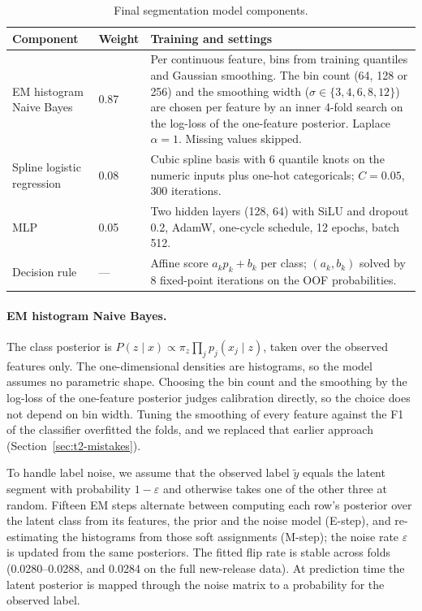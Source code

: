 \documentclass[../main.tex]{subfiles}
\begin{document}
\begin{table}[H]\centering\small
\begin{tabular}{@{}L{.20\linewidth}L{.09\linewidth}L{.62\linewidth}@{}}
\toprule
\textbf{Component} & \textbf{Weight} & \textbf{Training and settings} \\
\midrule
EM histogram Naive Bayes & 0.87 & Per continuous feature, bins from training quantiles and Gaussian smoothing. The bin count (64, 128 or 256) and the smoothing width ($\sigma\in\{3,4,6,8,12\}$) are chosen per feature by an inner 4-fold search on the log-loss of the one-feature posterior. Laplace $\alpha=1$. Missing values skipped. \\
Spline logistic regression & 0.08 & Cubic spline basis with 6 quantile knots on the numeric inputs plus one-hot categoricals; $C=0.05$, 300 iterations. \\
MLP & 0.05 & Two hidden layers (128, 64) with SiLU and dropout 0.2, AdamW, one-cycle schedule, 12 epochs, batch 512. \\
Decision rule & --- & Affine score $a_kp_k+b_k$ per class; $(a_k,b_k)$ solved by 8 fixed-point iterations on the OOF probabilities. \\
\bottomrule
\end{tabular}
\caption{Final segmentation model components.}\label{tab:t2-models}
\end{table}

\paragraph{EM histogram Naive Bayes.} The class posterior is $P(z\mid x)\propto \pi_z\prod_j p_j(x_j\mid z)$, taken over the observed features only. The one-dimensional densities are histograms, so the model assumes no parametric shape. Choosing the bin count and the smoothing by the log-loss of the one-feature posterior judges calibration directly, so the choice does not depend on bin width. Tuning the smoothing of every feature against the F1 of the classifier overfitted the folds, and we replaced that earlier approach (Section~\ref{sec:t2-mistakes}).

To handle label noise, we assume that the observed label $\tilde y$ equals the latent segment with probability $1-\varepsilon$ and otherwise takes one of the other three at random. Fifteen EM steps alternate between computing each row's posterior over the latent class from its features, the prior and the noise model (E-step), and re-estimating the histograms from those soft assignments (M-step); the noise rate $\varepsilon$ is updated from the same posteriors. The fitted flip rate is stable across folds (0.0280--0.0288, and 0.0284 on the full new-release data). At prediction time the latent posterior is mapped through the noise matrix to a probability for the observed label.
\end{document}
